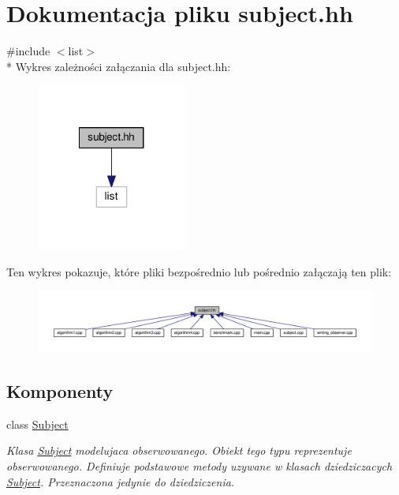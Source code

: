 \hypertarget{subject_8hh}{\section{Dokumentacja pliku subject.\-hh}
\label{subject_8hh}
}
{\ttfamily \#include $<$list$>$}\\*
Wykres zależności załączania dla subject.\-hh\-:\nopagebreak
\begin{figure}[H]
\begin{center}
\leavevmode
\includegraphics[width=140pt]{subject_8hh__incl}
\end{center}
\end{figure}
Ten wykres pokazuje, które pliki bezpośrednio lub pośrednio załączają ten plik\-:\nopagebreak
\begin{figure}[H]
\begin{center}
\leavevmode
\includegraphics[width=350pt]{subject_8hh__dep__incl}
\end{center}
\end{figure}
\subsection*{Komponenty}
\begin{DoxyCompactItemize}
\item 
class \hyperlink{class_subject}{Subject}
\begin{DoxyCompactList}\small\item\em Klasa \hyperlink{class_subject}{Subject} modelujaca obserwowanego. Obiekt tego typu reprezentuje obserwowanego. Definiuje podstawowe metody uzywane w klasach dziedziczacych \hyperlink{class_subject}{Subject}. Przeznaczona jedynie do dziedziczenia. \end{DoxyCompactList}\end{DoxyCompactItemize}
